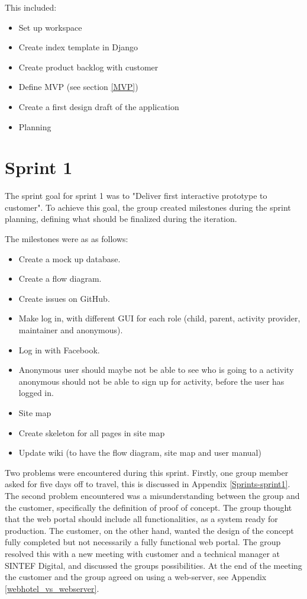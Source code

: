 This included:
\begin{itemize}[noitemsep]
    \item Set up workspace
    \item Create index template in Django
    \item Create product backlog with customer
    \item Define MVP (see section \ref{MVP})
    \item Create a first design draft of the application
    \item Planning
\end{itemize}


\section{Sprint 1}
\label{sprint1}
The sprint goal for sprint 1 was to "Deliver first interactive prototype to customer". To achieve this goal, the group created milestones during the sprint planning, defining what should be finalized during the iteration. 

The milestones were as as follows:
\begin{itemize}[noitemsep]
  \item Create a mock up database.
  \item Create a flow diagram.
  \item Create issues on GitHub.
  \item Make log in, with different GUI for each role (child, parent, activity      provider, maintainer and anonymous).
  \item Log in with Facebook.
  \item Anonymous user should maybe not be able to see who is going to a activity anonymous should not be able to sign up for activity, before the user has logged in.
  \item Site map
  \item Create skeleton for all pages in site map
  \item Update wiki (to have the flow diagram, site map and user manual)
\end{itemize}
 
Two problems were encountered during this sprint. Firstly, one group member asked for five days off to travel, this is discussed in Appendix \ref{Sprints-sprint1}. The second problem encountered was a misunderstanding between the group and the customer, specifically the definition of proof of concept. The group thought that the web portal should include all functionalities, as a system ready for production. The customer, on the other hand, wanted the design of the concept fully completed but not necessarily a fully functional web portal. The group resolved this with a new meeting with customer and a technical manager at SINTEF Digital, and discussed the groups possibilities. At the end of the meeting the customer and the group agreed on using a web-server, see Appendix \ref{webhotel_vs_webserver}.


